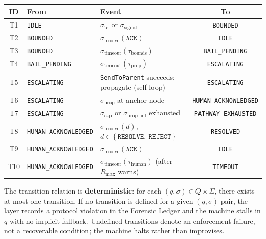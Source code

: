 \medskip
\noindent\begin{minipage}{\linewidth}
\label{tab:bp-transitions}
\medskip
\noindent\begin{tabular}{cllc}
\toprule
\textbf{ID} & \textbf{From} & \textbf{Event} & \textbf{To} \\
\midrule
T1 & \texttt{IDLE}                  & $\sigma_{\text{tc}}$ or $\sigma_{\text{signal}}$                      & \texttt{BOUNDED} \\
T2 & \texttt{BOUNDED}               & $\sigma_{\text{resolve}}(\texttt{ACK})$                               & \texttt{IDLE} \\
T3 & \texttt{BOUNDED}               & $\sigma_{\text{timeout}}(\tau_{\text{bounds}})$                      & \texttt{BAIL\_PENDING} \\
T4 & \texttt{BAIL\_PENDING}         & $\sigma_{\text{timeout}}(\tau_{\text{prop}})$                       & \texttt{ESCALATING} \\
T5 & \texttt{ESCALATING}           & \texttt{SendToParent} succeeds; propagate (self-loop)               & \texttt{ESCALATING} \\
T6 & \texttt{ESCALATING}           & $\sigma_{\text{prop}}$ at anchor node                               & \texttt{HUMAN\_ACKNOWLEDGED} \\
T7 & \texttt{ESCALATING}           & $\sigma_{\text{cap}}$ or $\sigma_{\text{prop\_fail}}$ exhausted      & \texttt{PATHWAY\_EXHAUSTED} \\
T8 & \texttt{HUMAN\_ACKNOWLEDGED}  & $\sigma_{\text{resolve}}(d)$, $d \in \{\,\texttt{RESOLVE},\ \texttt{REJECT}\,\}$ & \texttt{RESOLVED} \\
T9 & \texttt{HUMAN\_ACKNOWLEDGED}  & $\sigma_{\text{resolve}}(\texttt{ACK})$                              & \texttt{IDLE} \\
T10 & \texttt{HUMAN\_ACKNOWLEDGED} & $\sigma_{\text{timeout}}(\tau_{\text{human}})$ (after $R_{\max}$ warns) & \texttt{TIMEOUT} \\
\bottomrule
\end{tabular}
\end{minipage}

\medskip
The transition relation is \textbf{deterministic}: for each $(q, \sigma) \in Q \times \Sigma$, there exists at most one transition. If no transition is defined for a given $(q, \sigma)$ pair, the \fact{} layer records a protocol violation in the Forensic Ledger and the machine stalls in $q$ with no implicit fallback. Undefined transitions denote an enforcement failure, not a recoverable condition; the machine halts rather than improvises.

